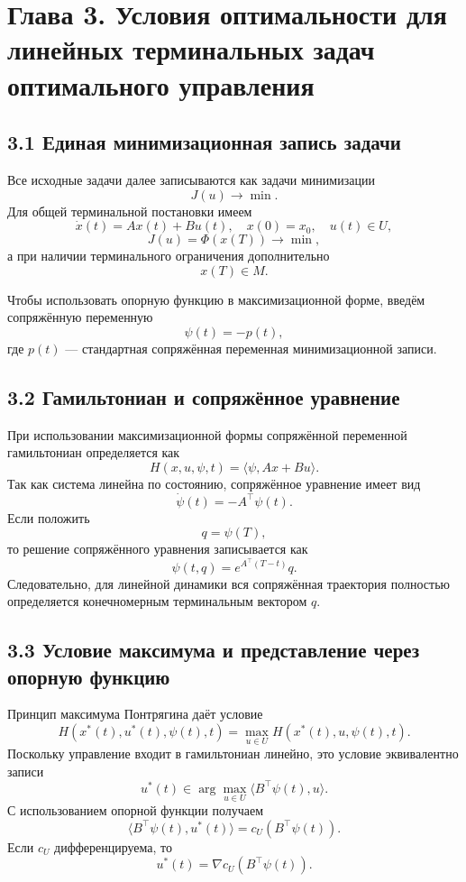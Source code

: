 \documentclass[a4paper,12pt]{article}
\begin{document}
\section{Глава 3. Условия оптимальности для линейных терминальных задач оптимального управления}

\subsection{3.1 Единая минимизационная запись задачи}

Все исходные задачи далее записываются как задачи минимизации
\[
J(u)\to\min.
\]
Для общей терминальной постановки имеем
\[
\dot{x}(t)=Ax(t)+Bu(t),\quad x(0)=x_0,\quad u(t)\in U,
\]
\[
J(u)=\Phi(x(T))\to\min,
\]
а при наличии терминального ограничения дополнительно
\[
x(T)\in M.
\]

Чтобы использовать опорную функцию в максимизационной форме, введём сопряжённую переменную
\[
\psi(t)=-p(t),
\]
где $p(t)$ --- стандартная сопряжённая переменная минимизационной записи.

\subsection{3.2 Гамильтониан и сопряжённое уравнение}

При использовании максимизационной формы сопряжённой переменной гамильтониан определяется как
\[
H(x,u,\psi,t)=\langle \psi,Ax+Bu\rangle.
\]
Так как система линейна по состоянию, сопряжённое уравнение имеет вид
\[
\dot{\psi}(t)=-A^\top\psi(t).
\]
Если положить
\[
q=\psi(T),
\]
то решение сопряжённого уравнения записывается как
\[
\psi(t,q)=e^{A^\top(T-t)}q.
\]
Следовательно, для линейной динамики вся сопряжённая траектория полностью определяется конечномерным терминальным вектором $q$.

\subsection{3.3 Условие максимума и представление через опорную функцию}

Принцип максимума Понтрягина даёт условие\cite[с. 23--27]{pontryagin1969}\cite[с. 336--371]{lee1972}\cite[с. 8--15]{blagodatskikh2001}
\[
H(x^*(t),u^*(t),\psi(t),t)=\max_{u\in U}H(x^*(t),u,\psi(t),t).
\]
Поскольку управление входит в гамильтониан линейно, это условие эквивалентно записи
\[
u^*(t)\in\arg\max_{u\in U}\langle B^\top\psi(t),u\rangle.
\]
С использованием опорной функции получаем
\[
\langle B^\top\psi(t),u^*(t)\rangle=c_U(B^\top\psi(t)).
\]
Если $c_U$ дифференцируема, то
\[
u^*(t)=\nabla c_U(B^\top\psi(t)).
\]
\end{document}
